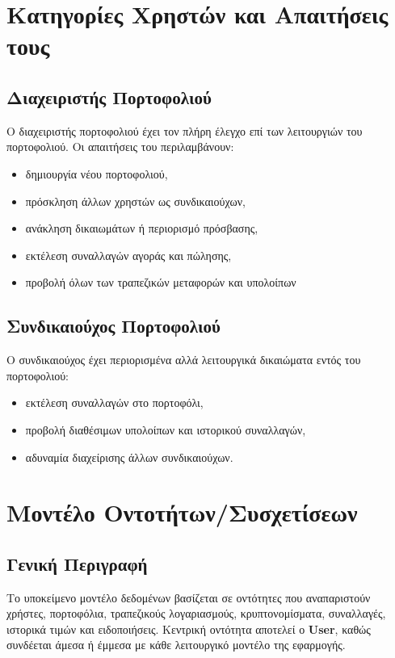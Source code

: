 \documentclass[a4paper,12pt]{article}
\begin{document}
\section{Κατηγορίες Χρηστών και Απαιτήσεις τους}

\subsection*{Διαχειριστής Πορτοφολιού}
Ο διαχειριστής πορτοφολιού έχει τον πλήρη έλεγχο επί των λειτουργιών του πορτοφολιού. Οι απαιτήσεις
του περιλαμβάνουν:
\begin{itemize}
    \item δημιουργία νέου πορτοφολιού,
    \item πρόσκληση άλλων χρηστών ως συνδικαιούχων,
    \item ανάκληση δικαιωμάτων ή περιορισμό πρόσβασης,
    \item εκτέλεση συναλλαγών αγοράς και πώλησης,
    \item προβολή όλων των τραπεζικών μεταφορών και υπολοίπων
\end{itemize}

\subsection*{Συνδικαιούχος Πορτοφολιού}
Ο συνδικαιούχος έχει περιορισμένα αλλά λειτουργικά δικαιώματα εντός του πορτοφολιού:
\begin{itemize}
    \item εκτέλεση συναλλαγών στο πορτοφόλι,
    \item προβολή διαθέσιμων υπολοίπων και ιστορικού συναλλαγών,
    \item αδυναμία διαχείρισης άλλων συνδικαιούχων.
\end{itemize}

\newpage

\section{Μοντέλο Οντοτήτων/Συσχετίσεων}

\subsection{Γενική Περιγραφή}
Το υποκείμενο μοντέλο δεδομένων βασίζεται σε οντότητες που αναπαριστούν χρήστες, πορτοφόλια,
τραπεζικούς λογαριασμούς, κρυπτονομίσματα, συναλλαγές, ιστορικά τιμών και ειδοποιήσεις. Κεντρική
οντότητα αποτελεί ο \textbf{User}, καθώς συνδέεται άμεσα 
ή έμμεσα με κάθε λειτουργικό μοντέλο της εφαρμογής.
\end{document}
